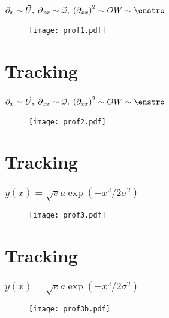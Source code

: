 \begin{frame}
 \frametitle{$ \partial_x \sim \vec{U}, \; \partial_{xx} \sim \vec{\omega}, \;  \left(\partial_{xx}\right)^2 \sim OW \sim \enstro$}
\begin{figure}
	\centering
	\texttt{[image: prof1.pdf]}
\end{figure}
\end{frame}



\section{Tracking}
\begin{frame}
 \frametitle{$ \partial_x \sim \vec{U}, \; \partial_{xx} \sim \vec{\omega}, \;  \left(\partial_{xx}\right)^2 \sim OW \sim \enstro$}
\begin{figure}
	\centering
	\texttt{[image: prof2.pdf]}
\end{figure}
\end{frame}

\section{Tracking}
\begin{frame}
 \frametitle{$ y(x)=\sqrt{e} a \exp{\left(- x^2/2\sigma^2\right)}$}
\begin{figure}
	\centering
	\texttt{[image: prof3.pdf]}
\end{figure}
\end{frame}


\section{Tracking}
\begin{frame}
 \frametitle{$ y(x)=\sqrt{e} a \exp{\left(- x^2/2\sigma^2\right)}$}
\begin{figure}
	\centering
	\texttt{[image: prof3b.pdf]}
\end{figure}
\end{frame}

